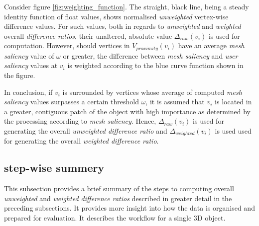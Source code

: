 Consider figure \ref{fig:weighting_function}. The straight, black line, being a steady identity function of float values, shows normalised \textit{unweighted} vertex-wise difference values. For such values, both in regards to \textit{unweighted} and \textit{weighted} overall \textit{difference ratios}, their unaltered, absolute value $\Delta_{raw}(v_i)$ is used for computation. However, should vertices in $V_{proximity}(v_i)$ have an average \textit{mesh saliency} value of $\omega$ or greater, the difference between \textit{mesh saliency} and \textit{user saliency} values at $v_i$ is weighted according to the blue curve function shown in the figure.

In conclusion, if $v_i$ is surrounded by vertices whose average of computed \textit{mesh saliency} values surpasses a certain threshold $\omega$, it is assumed that $v_i$ is located in a greater, contiguous patch of the object with high importance as determined by the processing according to \textit{mesh saliency}. Hence, $\Delta_{raw}(v_i)$ is used for generating the overall \textit{unweighted difference ratio} and $\Delta_{weighted}(v_i)$ is used used for generating the overall \textit{weighted difference ratio}.

		\subsection{step-wise summery}
		\label{sec:ste_wise_summery}
This subsection provides a brief summary of the steps to computing overall \textit{unweighted} and \textit{weighted difference ratios} described in greater detail in the preceding subsections. It provides more insight into how the data is organised and prepared for evaluation. It describes the workflow for a single 3D object.

